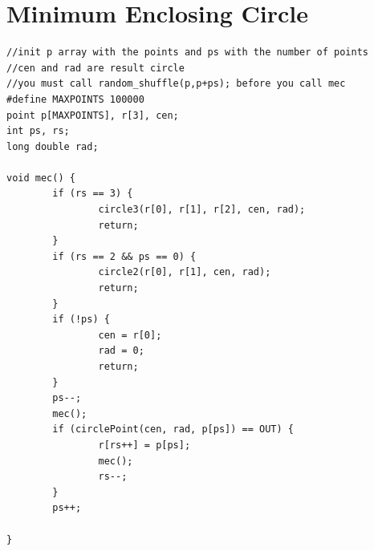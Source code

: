 \documentclass[12pt]{book}
\begin{document}
\section{Minimum Enclosing Circle}
\begin{verbatim}
//init p array with the points and ps with the number of points
//cen and rad are result circle
//you must call random_shuffle(p,p+ps); before you call mec
#define MAXPOINTS 100000
point p[MAXPOINTS], r[3], cen;
int ps, rs;
long double rad;

void mec() {
        if (rs == 3) {
                circle3(r[0], r[1], r[2], cen, rad);
                return;
        }
        if (rs == 2 && ps == 0) {
                circle2(r[0], r[1], cen, rad);
                return;
        }
        if (!ps) {
                cen = r[0];
                rad = 0;
                return;
        }
        ps--;
        mec();
        if (circlePoint(cen, rad, p[ps]) == OUT) {
                r[rs++] = p[ps];
                mec();
                rs--;
        }
        ps++;

}
\end{verbatim}
\end{document}
